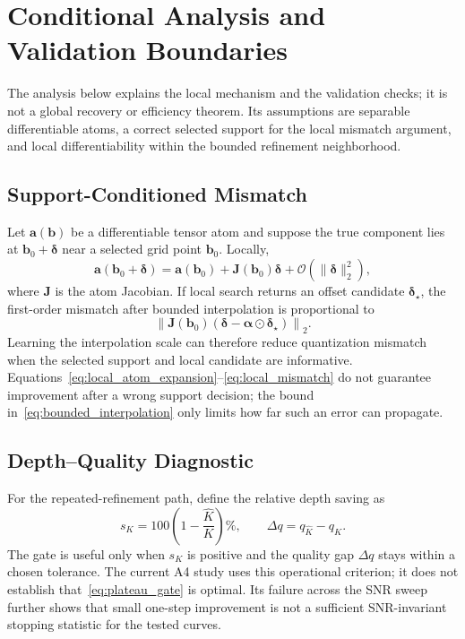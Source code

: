\section{Conditional Analysis and Validation Boundaries}
\label{sec:theory}

The analysis below explains the local mechanism and the validation checks; it is not a global recovery or efficiency theorem. Its assumptions are separable differentiable atoms, a correct selected support for the local mismatch argument, and local differentiability within the bounded refinement neighborhood.

\subsection{Support-Conditioned Mismatch}

Let $\mathbf{a}(\mathbf{b})$ be a differentiable tensor atom and suppose the true component lies at $\mathbf{b}_0+\boldsymbol{\delta}$ near a selected grid point $\mathbf{b}_0$. Locally,
\begin{equation}
 \mathbf{a}(\mathbf{b}_0+\boldsymbol{\delta})
 =\mathbf{a}(\mathbf{b}_0)
 +\mathbf{J}(\mathbf{b}_0)\boldsymbol{\delta}
 +\mathcal{O}(\|\boldsymbol{\delta}\|_2^2),
 \label{eq:local_atom_expansion}
\end{equation}
where $\mathbf{J}$ is the atom Jacobian. If local search returns an offset candidate $\boldsymbol{\delta}_\star$, the first-order mismatch after bounded interpolation is proportional to
\begin{equation}
 \left\|\mathbf{J}(\mathbf{b}_0)
   (\boldsymbol{\delta}-\boldsymbol{\alpha}\odot\boldsymbol{\delta}_\star)
 \right\|_2.
 \label{eq:local_mismatch}
\end{equation}
Learning the interpolation scale can therefore reduce quantization mismatch when the selected support and local candidate are informative. Equations~\eqref{eq:local_atom_expansion}--\eqref{eq:local_mismatch} do not guarantee improvement after a wrong support decision; the bound in~\eqref{eq:bounded_interpolation} only limits how far such an error can propagate.

\subsection{Depth--Quality Diagnostic}

For the repeated-refinement path, define the relative depth saving as
\begin{equation}
 s_K=100\left(1-\frac{\widehat K}{K}\right)\%,
 \qquad
 \Delta q=q_{\widehat K}-q_K.
 \label{eq:depth_metrics}
\end{equation}
The gate is useful only when $s_K$ is positive and the quality gap $\Delta q$ stays within a chosen tolerance. The current A4 study uses this operational criterion; it does not establish that~\eqref{eq:plateau_gate} is optimal. Its failure across the SNR sweep further shows that small one-step improvement is not a sufficient SNR-invariant stopping statistic for the tested curves.

